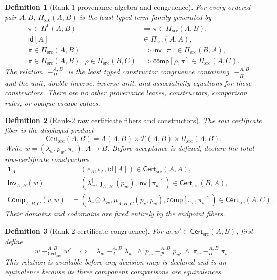 \documentclass[11pt]{article}
\newtheorem{definition}{Definition}
\newcommand{\Cert}{\mathsf{Cert}_{\mathrm{src}}}
\newcommand{\PiSrc}{\Pi_{\mathrm{src}}}
\begin{document}
\begin{definition}[Rank-1 provenance algebra and congruence]
For every ordered pair \(A,B\), \(\PiSrc(A,B)\) is the least typed term family
generated by
\[
\begin{aligned}
 \pi\in\Pi^0(A,B)&\Longrightarrow \pi\in\PiSrc(A,B),\\
 \mathsf{id}[A]&\in\PiSrc(A,A),\\
 \pi\in\PiSrc(A,B)&\Longrightarrow
     \mathsf{inv}[\pi]\in\PiSrc(B,A),\\
 \pi\in\PiSrc(A,B),\ \rho\in\PiSrc(B,C)&\Longrightarrow
     \mathsf{comp}[\rho,\pi]\in\PiSrc(A,C).
\end{aligned}
\]
The relation \(\equiv_\Pi^{A,B}\) is the least typed constructor congruence
containing \(\equiv_{\Pi^0}^{A,B}\) and the unit, double-inverse, inverse-unit,
and associativity equations for these constructors. There are no other
provenance leaves, constructors, comparison rules, or opaque escape values.
\end{definition}

\begin{definition}[Rank-2 raw certificate fibers and constructors]
The raw certificate fiber is the displayed product
\[
 \Cert(A,B)=
 \Lambda(A,B)\times\mathcal P(A,B)\times\PiSrc(A,B).
\]
Write \(w=(\lambda_w,p_w,\pi_w):A\to B\). Before acceptance is defined,
declare the total raw-certificate constructors
\[
\begin{aligned}
 \mathbf 1_A
   &=(e_A,\iota_A,\mathsf{id}[A])\in\Cert(A,A),\\
 \mathsf{Inv}_{A,B}(w)
   &=(\lambda_w^\dagger,\jmath_{A,B}(p_w),
      \mathsf{inv}[\pi_w])\in\Cert(B,A),\\
 \mathsf{Comp}_{A,B,C}(v,w)
   &=(\lambda_v\odot\lambda_w,
      \mu_{A,B,C}(p_v,p_w),
      \mathsf{comp}[\pi_v,\pi_w])\in\Cert(A,C).
\end{aligned}
\]
Their domains and codomains are fixed entirely by the endpoint fibers.
\end{definition}

\begin{definition}[Rank-2 certificate congruence]
For \(w,w'\in\Cert(A,B)\), first define
\[
 w\equiv_{\Cert}^{A,B}w'
 \quad\Longleftrightarrow\quad
 \lambda_w\equiv_\Lambda^{A,B}\lambda_{w'}
 \ \wedge\
 p_w\equiv_{\mathcal P}^{A,B}p_{w'}
 \ \wedge\
 \pi_w\equiv_\Pi^{A,B}\pi_{w'}.
\]
This relation is available before any decision map is declared and is an
equivalence because its three component comparisons are equivalences.
\end{definition}
\end{document}
